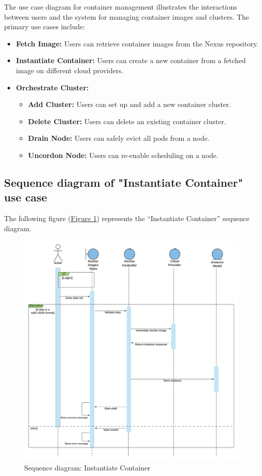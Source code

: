 The use case diagram for container management illustrates the interactions between users and the system for managing container images and clusters. The primary use cases include:

\begin{itemize}
  \item \textbf{Fetch Image:} Users can retrieve container images from the Nexus repository.
  \item \textbf{Instantiate Container: } Users can create a new container from a fetched image on different cloud providers.
  \item \textbf{Orchestrate Cluster:}
  \begin{itemize}
  \item \textbf{Add Cluster:} Users can set up and add a new container cluster.
  \item \textbf{Delete Cluster:} Users can delete an existing container cluster.
  \item \textbf{Drain Node:} Users can safely evict all pods from a node.
  \item \textbf{Uncordon Node:} Users can re-enable scheduling on a node.
  \end{itemize}
\end{itemize}

\subsection{Sequence diagram of "Instantiate Container" use case}

The following figure (\hyperref[fig:seq-instantiate]{Figure \ref{fig:seq-instantiate}})  represents the ``Instantiate Container'' sequence diagram.
\begin{figure}[h]
  \center
  \includegraphics[width=14cm]{./chapters/sprint3/seq-instantiate.png}
  \caption{Sequence diagram: Instantiate Container}
  \label{fig:seq-instantiate}
\end{figure}

